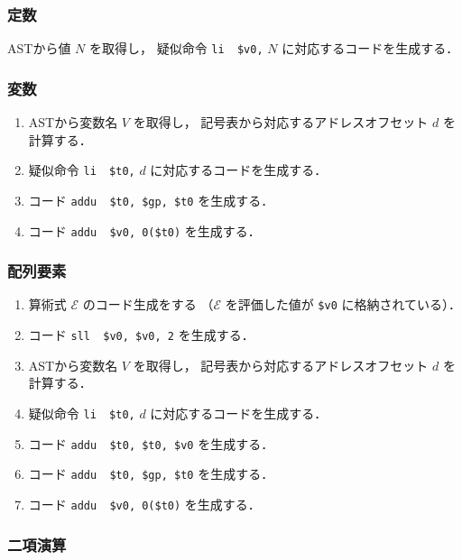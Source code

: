 \documentclass[lualatex, a4paper, ja=standard]{bxjsarticle}
\begin{document}
\subsubsection{定数}

ASTから値 $N$ を取得し，
疑似命令 \verb|li  $v0,| $N$ に対応するコードを生成する．

\subsubsection{変数}

\begin{enumerate}
  \item ASTから変数名 $V$ を取得し，
  記号表から対応するアドレスオフセット $d$ を計算する．
  \item 疑似命令 \verb|li  $t0,| $d$ に対応するコードを生成する．
  \item コード \verb|addu  $t0, $gp, $t0| を生成する．
  \item コード \verb|addu  $v0, 0($t0)| を生成する．
\end{enumerate}

\subsubsection{配列要素}

\begin{enumerate}
  \item 算術式 $\mathcal{E}$ のコード生成をする
  （$\mathcal{E}$ を評価した値が \verb|$v0| に格納されている）．
  \item コード \verb|sll  $v0, $v0, 2| を生成する．
  \item ASTから変数名 $V$ を取得し，
  記号表から対応するアドレスオフセット $d$ を計算する．
  \item 疑似命令 \verb|li  $t0,| $d$ に対応するコードを生成する．
  \item コード \verb|addu  $t0, $t0, $v0| を生成する．
  \item コード \verb|addu  $t0, $gp, $t0| を生成する．
  \item コード \verb|addu  $v0, 0($t0)| を生成する．
\end{enumerate}

\subsubsection{二項演算}
\end{document}
